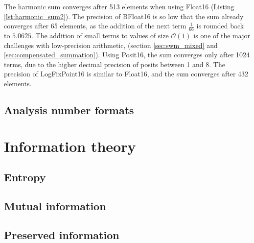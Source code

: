 The harmonic sum converges after 513 elements when using Float16 (Listing \ref{lst:harmonic_sum2}). The precision of BFloat16
is so low that the sum already converges after 65 elements, as the addition of the next term $\tfrac{1}{66}$ is rounded back to
$5.0625$. The addition of small terms to values of size $\mathcal{O}(1)$ is one of the major challenges with low-precision arithmetic,
(section \ref{sec:swm_mixed} and \ref{sec:compensated_summation}). Using Posit16, the sum converges only after 1024 terms,
due to the higher decimal precision of posits between 1 and 8. The precision of LogFixPoint16 is similar to Float16, and the sum
converges after 432 elements.

\subsection{Analysis number formats}
\label{sec:analysis_number_formats}

\section{Information theory}
\label{sec:information}

\subsection{Entropy}
\label{sec:entropy}

\subsection{Mutual information}
\label{sec:mutual_information}

\subsection{Preserved information}
\label{sec:preserved_information}


